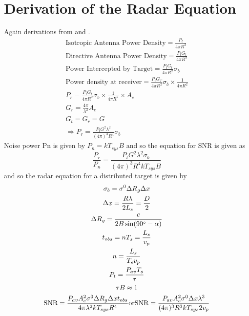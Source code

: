 \section{Derivation of the Radar Equation}
Again derivations from \cite{richardsRemoteSensingImaging2009} and \cite{watsonEE40136RadarSystems2020}. \begin{gather}
 \text{Isotropic Antenna Power Density} = \frac{P_t}{4\pi R^2}\\
 \text{Directive Antenna Power Density} = \frac{P_tG_t}{4\pi R^2}\\
 \text{Power Intercepted by Target} = \frac{P_tG_t}{4\pi R^2}\sigma_b\\
 \text{Power density at receiver} = \frac{P_tG_T}{4\pi R^2}\sigma_b \times \frac{1}{4\pi R^2}\\
 P_r = \frac{P_tG_t}{4\pi R^2} \sigma_b \times \frac{1}{4\pi R^2} \times A_e \\
 G_r = \frac{4\pi}{\lambda^2}A_e\\
 G_t = G_r = G \\
 \Rightarrow P_r = \frac{P_tG^2\lambda^2}{(4\pi)^3R^4}\sigma_b
 \end{gather}
 Noise power \gls{Pn} is given by $P_n = kT_{sys}B$ and so the equation for SNR is given as \[ \frac{P_r}{P_n} = \frac{P_tG^2\lambda^2\sigma_b}{(4\pi)^3R^4kT_{sys}B}\] and so the radar equation for a distributed target is given by 
 \begin{gather}
 \sigma_b = \sigma^0 \Delta R_g \Delta x \\
 	\Delta x = \frac{R\lambda}{2L_s} = \frac{D}{2}\\
 	\Delta R_g = \frac{c}{2B\sin(90\degree - \alpha)}\\
 	t_{obs} = nT_s = \frac{L_s}{v_p}\\
 	n = \frac{L_s}{T_sv_p}\\
 	P_t = \frac{P_{av}T_s}{\tau}\\
 	\tau B \approx 1\\
 	\text{SNR}=\frac{P_{av}A_e^2\sigma^0\Delta R_g\Delta x t_{obs}}{4\pi\lambda^2kT_{sys}R^4} \text{or} \text{SNR} = \frac{P_{av}A_e^2\sigma^0\Delta x\lambda^3}{(4\pi)^3R^3kT_{sys}2v_p}
 \end{gather}





